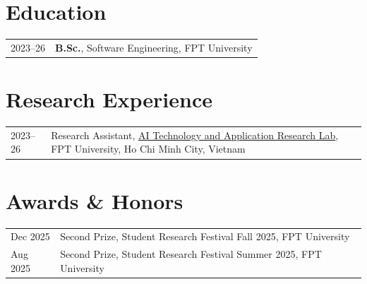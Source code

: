 
\RaggedRight

\section*{Education}
\begin{longtable}[l]{@{}p{} p{}}
  2023--26\footnotemark & \textbf{B.Sc.}, Software Engineering, FPT University \\
\end{longtable}


\renewcommand{\thefootnote}{\arabic{footnote}}
\setcounter{footnote}{1}

\section*{Research Experience}
\label{exp_research}
\begin{longtable}[l]{@{}p{} p{}}
  2023--26\footnotemark & Research Assistant, \href{https://aita-lab.github.io/}{AI Technology and Application Research Lab}, FPT University, Ho Chi Minh City, Vietnam \\
\end{longtable}

\section*{Awards \& Honors}
\label{awards}
\begin{longtable}[l]{@{}p{} p{}}
  Dec 2025 & Second Prize, Student Research Festival Fall 2025, FPT University \\
  Aug 2025 & Second Prize, Student Research Festival Summer 2025, FPT University \\
\end{longtable}


